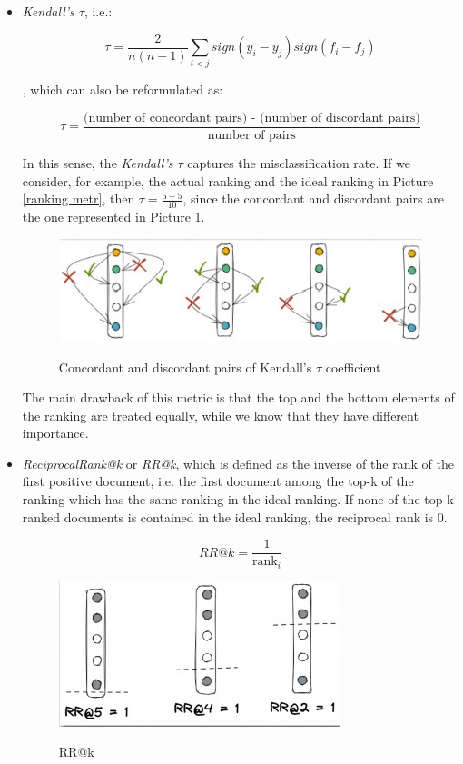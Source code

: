 \begin{itemize}
    \item \textit{Kendall's $\tau$}, i.e.:

    $$
    \tau = \frac{2}{n(n-1)} \sum_{i<j} sign(y_i - y_j) sign(f_i - f_j)
    $$

    , which can also be reformulated as:

    $$
    \tau = \frac{\text{(number of concordant pairs) - (number of discordant pairs)}}{\text{number of pairs}}
    $$

    In this sense, the \textit{Kendall's $\tau$} captures the misclassification rate. If we consider, for example, the actual ranking and the ideal ranking in Picture \ref{ranking metr}, then $\tau = \frac{5 - 5}{10}$, since the concordant and discordant pairs are the one represented in Picture \ref{kendall}.

    \begin{figure}[h!]
		\centering
		\includegraphics[scale = 2.0]{img/kendall's tau.jpg}
        \label{kendall}
        \caption{Concordant and discordant pairs of Kendall's $\tau$ coefficient}
    \end{figure}

    The main drawback of this metric is that the top and the bottom elements of the ranking are treated equally, while we know that they have different importance.

    \item \textit{ReciprocalRank@k} or \textit{RR@k}, which is defined as the inverse of the rank of the first positive document, i.e. the first document among the top-k of the ranking which has the same ranking in the ideal ranking. If none of the top-k ranked documents is contained in the ideal ranking, the reciprocal rank is 0.

    $$
    RR@k = \frac{1}{\text{rank}_i}
    $$

    \begin{figure}[h!]
		\centering
		\includegraphics[scale = 2.0]{img/rr@k.jpg}
        \label{rr}
        \caption{RR@k}
    \end{figure}


\end{itemize}
